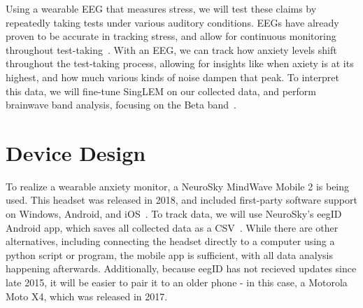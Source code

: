 \documentclass[journal]{IEEEtran}
\begin{document}
Using a wearable EEG that measures stress, we will test these claims by repeatedly taking tests under various auditory conditions. EEGs have already proven to be accurate in tracking stress, and allow for continuous monitoring throughout test-taking~\cite{sukhbaatarSingLEMSingleChannelLarge2025}. With an EEG, we can track how anxiety levels shift throughout the test-taking process, allowing for insights like when axiety is at its highest, and how much various kinds of noise dampen that peak. To interpret this data, we will fine-tune SingLEM on our collected data, and perform brainwave band analysis, focusing on the Beta band~\cite{sukhbaatarSingLEMSingleChannelLarge2025, muhammadumarsaeedQuantificationHumanStress2017}.

\section{Device Design}

To realize a wearable anxiety monitor, a NeuroSky MindWave Mobile 2 is being used. This headset was released in 2018, and included first-party software support on Windows, Android, and iOS~\cite{neuroskyNeuroSkyMindWaveMobile2018}. To track data, we will use NeuroSky's eegID Android app, which saves all collected data as a CSV~\cite{isomerprogrammingllcEegID2015}. While there are other alternatives, including connecting the headset directly to a computer using a python script or program, the mobile app is sufficient, with all data analysis happening afterwards. Additionally, because eegID has not recieved updates since late 2015, it will be easier to pair it to an older phone - in this case, a Motorola Moto X4, which was released in 2017.
\end{document}
